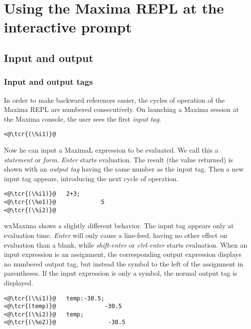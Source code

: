 \documentclass[../Maxima_Workbook.tex]{subfiles}
\begin{document}
	
\chapter{Using the Maxima REPL at the interactive prompt}

\section{Input and output}

\subsection{Input and output tags}\label{IO1}

In order to make backward references easier, the cycles of operation of the Maxima REPL are numbered consecutively. On launching a Maxima session at the Maxima console, the user sees the first \emph{input tag}. 

\lz \begin{lstlisting}
<@\tcr{(\%i1)}@
\end{lstlisting}

\lz Now he can input a MaximaL expression to be evaluated. We call this a \emph{statement} or \emph{form}. \emph{Enter} starts evaluation. The result (the value returned) is shown with an \emph{output tag} having the same number as the input tag. Then a new input tag appears, introducing the next cycle of operation.

\lz \begin{lstlisting}
<@\tcr{(\%i1)}@   2+3;
<@\tcr{(\%o1)}@				5
<@\tcr{(\%i2)}@
\end{lstlisting}

\lz wxMaxima shows a slightly different behavior. The input tag appears only at evaluation time. \emph{Enter} will only cause a line-feed, having no other effect on evaluation than a blank, while \emph{shift-enter} or \emph{ctrl-enter} starts evaluation. When an input expression is an assignment, the corresponding output expression displays no numbered output tag, but instead the symbol to the left of the assignment in parentheses. If the input expression is only a symbol, the normal output tag is displayed.

\lz \begin{lstlisting}
<@\tcr{(\%i1)}@   temp:-30.5;
<@\tcr{(temp)}@			     -30.5
<@\tcr{(\%i2)}@   temp;
<@\tcr{(\%o2)}@			      -30.5
\end{lstlisting}
\end{document}
